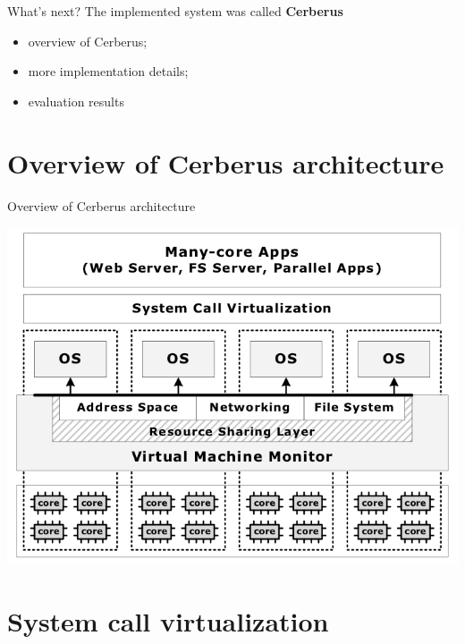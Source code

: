 \documentclass{beamer}
\begin{document}
\begin{frame}[t]{What's next?}
  The implemented system was called \textbf{Cerberus}
  \newline 

  \begin{itemize}
    \item overview of Cerberus;
    \item more implementation details;
    \item evaluation results
  \end{itemize}
\end{frame}

\section{Overview of Cerberus architecture}

\begin{frame}{Overview of Cerberus architecture}
  \begin{center}
    \includegraphics[scale=0.3]{overview.png}
  \end{center}
\end{frame}

\section{System call virtualization}
\end{document}
